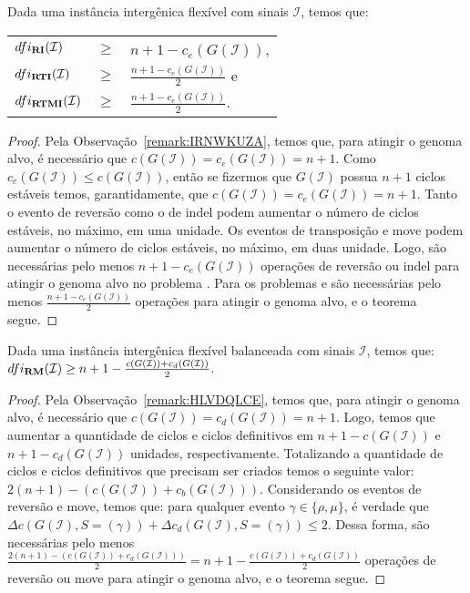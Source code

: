 \begin{theorem}\label{theorem:SZNBDWOM}
Dada uma instância intergênica flexível com sinais $\mathcal{I}$, temos que:

\begin{tabular}{lll}
  $dfi_{\textbf{RI}}(\mathcal{I})$       & $ \ge $ & ${n+1} - c_e(G(\mathcal{I} ))$,            \\
  $dfi_{\textbf{RTI}}(\mathcal{I})$      & $ \ge $ & $\frac{{n+1} - c_e(G(\mathcal{I} ))}{2}$ e \\
  $dfi_{\textbf{RTMI}}(\mathcal{I})$     & $ \ge $ & $\frac{{n+1} - c_e(G(\mathcal{I} ))}{2}$.  \\
\end{tabular}
\end{theorem}
\begin{proof}
Pela Observação~\ref{remark:IRNWKUZA}, temos que, para atingir o genoma alvo, é necessário que $c(G(\mathcal{I})) = c_e(G(\mathcal{I})) = n+1$. Como $c_e(G(\mathcal{I})) \le c(G(\mathcal{I}))$, então se fizermos que $G(\mathcal{I})$ possua $n+1$ ciclos estáveis temos, garantidamente, que $c(G(\mathcal{I})) = c_e(G(\mathcal{I})) = n+1$. Tanto o evento de reversão como o de indel podem aumentar o número de ciclos estáveis, no máximo, em uma unidade. Os eventos de transposição e move podem aumentar o número de ciclos estáveis, no máximo, em duas unidade. Logo, são necessárias pelo menos ${n+1} - c_e(G(\mathcal{I} ))$ operações de reversão ou indel para atingir o genoma alvo no problema \SbFIRI{}. Para os problemas \SbFIRTI{} e \SbFIRTMI{} são necessárias pelo menos $\frac{{n+1} - c_e(G(\mathcal{I} ))}{2}$ operações para atingir o genoma alvo, e o teorema segue. 
\end{proof}

\begin{theorem}\label{theorem:CNMFNKPK}
Dada uma instância intergênica flexível balanceada com sinais $\mathcal{I}$, temos que: $dfi_{\textbf{RM}}(\mathcal{I}) \ge {n+1} - \frac{c(G(\mathcal{I} )) + c_d(G(\mathcal{I} ))}{2}$.
\end{theorem}
\begin{proof}
Pela Observação~\ref{remark:HLVDQLCE}, temos que, para atingir o genoma alvo, é necessário que $c(G(\mathcal{I})) = c_d(G(\mathcal{I})) = n+1$. Logo, temos que aumentar a quantidade de ciclos e ciclos definitivos em ${n+1} - c(G(\mathcal{I}))$ e ${n+1} - c_d(G(\mathcal{I}))$ unidades, respectivamente. Totalizando a quantidade de ciclos e ciclos definitivos que precisam ser criados temos o seguinte valor: $2(n+1) - (c(G(\mathcal{I})) + c_b(G(\mathcal{I})))$. Considerando os eventos de reversão e move, temos que: para qualquer evento $\gamma \in \{\rho, \mu\}$, é verdade que $\Delta c(G(\mathcal{I}), S=(\gamma)) + \Delta c_d(G(\mathcal{I}), S=(\gamma)) \le 2$. Dessa forma, são necessárias pelo menos $\frac{2({n+1}) - (c(G(\mathcal{I})) + c_d(G(\mathcal{I})))}{2} = {n+1} - \frac{c(G(\mathcal{I} )) + c_d(G(\mathcal{I} ))}{2}$ operações de reversão ou move para atingir o genoma alvo, e o teorema segue. 
\end{proof}

